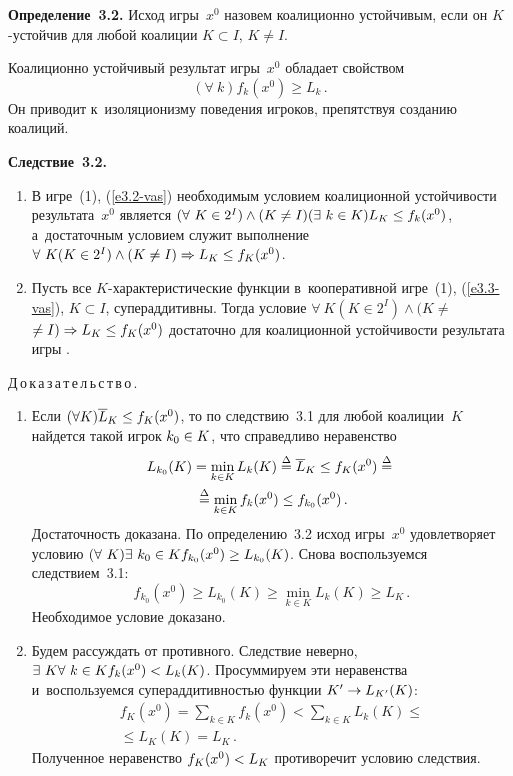 \begin{multicols}{2}
    \noindent
    \textbf{Определение~3.2.} Исход игры~$x^0$ назовем коалиционно
устойчивым, если он $K$-устой\-чив для любой коалиции $K\subset I$, $K\not=I$.

    \smallskip

    Коалиционно устойчивый результат игры~$x^0$ обладает свойством
    $$
    (\forall\ k) f_k(x^0)\geq L_k\,.
    $$
Он приводит к~изоляционизму поведения игроков, препятствуя созданию коалиций.

\smallskip

\noindent
\textbf{Следствие~3.2.}
\begin{enumerate}[1.]
\item  В игре~(1), (\ref{e3.2-vas}) необходимым условием коалиционной
устойчивости результата~$x^0$ является $(\forall\ K\in 2^I)\wedge (K\not= I)
(\exists\ k\in K) L_K\hm\leq f_k(x^0)$, а~достаточным условием служит выполнение
 $\forall\ K (K\in 2^I) \wedge (K\not= I)\Rightarrow L_K\hm\leq f_K(x^0)$.
    \item  Пусть все $K$-ха\-рак\-те\-ри\-сти\-че\-ские функции в~кооперативной
игре~(1), (\ref{e3.3-vas}), $K\subset I$,
супераддитивны. Тогда условие
$\forall\ K (K\in 2^I)\wedge (K\not=$\linebreak $\not= I)\Rightarrow L_K\hm\leq f_K(x^0)$ достаточно
для коалиционной устойчивости результата игры  .
    \end{enumerate}

    \noindent
    Д\,о\,к\,а\,з\,а\,т\,е\,л\,ь\,с\,т\,в\,о\,.\ \
    \begin{enumerate}[1.]
    \item Если $(\forall K) \overline{L}_K\hm\leq f_K(x^0)$, то по следствию~3.1 для
любой коалиции~$K$ найдется такой игрок $k_0\hm\in K$, что справедливо
неравенство
   \begin{multline*}
    L_{k_0}(K) =\min\limits_{k\in K} L_k(K) \stackrel{\Delta}{=} \overline{L}_K\leq f_K(x^0)
    \stackrel{\Delta}{=}{}\\
    {}\stackrel{\Delta}{=}
\min\limits_{k\in K} f_k(x^0)\leq f_{k_0}(x^0)\,.
    \end{multline*}
Достаточность доказана. По определению~3.2 исход игры~$x^0$ удовлетворяет
условию $(\forall\ K)\exists\ k_0\hm\in K f_{k_0}(x^0)\hm\geq L_{k_0}(K)$. Снова
воспользуемся следствием~3.1:
$$
f_{k_0}(x^0) \geq L_{k_0}(K)\geq \min\limits_{k\in K} L_k(K) \geq L_K\,.
$$
Необходимое условие доказано.
\item Будем рассуждать от противного. Следствие неверно, $\exists\ K \forall\ k\in K
f_k(x^0)\hm< L_k(K)$. Просуммируем эти неравенства и~воспользуемся
супераддитивностью функции $K^\prime\hm\to L_{K^\prime}(K)$:
\begin{multline*}
f_K(x^0) =\sum\limits_{k\in K} f_k(x^0) < \sum\limits_{k\in K} L_k(K) \leq{}\\
{}\leq
L_K(K)=L_K\,.
\end{multline*}
Полученное неравенство $f_K(x^0)\hm< L_K$ противоречит условию следствия.
\end{enumerate}


\end{multicols}
